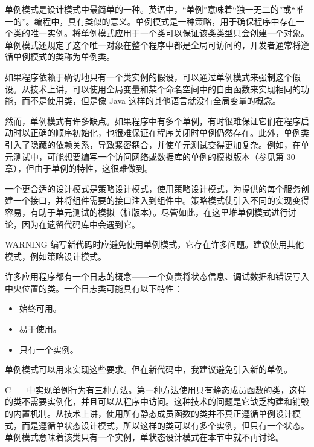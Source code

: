
单例模式是设计模式中最简单的一种。英语中，“单例”意味着“独一无二的”或“唯一的”。编程中，具有类似的意义。单例模式是一种策略，用于确保程序中存在一个类的唯一实例。将单例模式应用于一个类可以保证该类类型只会创建一个对象。单例模式还规定了这个唯一对象在整个程序中都是全局可访问的，开发者通常将遵循单例模式的类称为单例类。

如果程序依赖于确切地只有一个类实例的假设，可以通过单例模式来强制这个假设。从技术上讲，可以使用全局变量和某个命名空间中的自由函数来实现相同的功能，而不是使用类，但是像 Java 这样的其他语言就没有全局变量的概念。

然而，单例模式有许多缺点。如果程序中有多个单例，有时很难保证它们在程序启动时以正确的顺序初始化，也很难保证在程序关闭时单例仍然存在。此外，单例类引入了隐藏的依赖关系，导致紧密耦合，并使单元测试变得更加复杂。例如，在单元测试中，可能想要编写一个访问网络或数据库的单例的模拟版本（参见第 30 章），但由于单例的特性，这很难做到。

一个更合适的设计模式是策略设计模式，使用策略设计模式，为提供的每个服务创建一个接口，并将组件需要的接口注入到组件中。策略模式使引入不同的实现变得容易，有助于单元测试的模拟（桩版本）。尽管如此，在这里堆单例模式进行讨论，因为在遗留代码库中会遇到它。

\begin{myWarning}{WARNING}
编写新代码时应避免使用单例模式，它存在许多问题。建议使用其他模式，例如策略设计模式。
\end{myWarning}


许多应用程序都有一个日志的概念——一个负责将状态信息、调试数据和错误写入中央位置的类。一个日志类可能具有以下特性：

\begin{itemize}
\item
始终可用。

\item
易于使用。

\item
只有一个实例。
\end{itemize}

单例模式可以用来实现这些要求。但在新代码中，我建议避免引入新的单例。


C++ 中实现单例行为有三种方法。第一种方法使用只有静态成员函数的类，这样的类不需要实例化，并且可以从程序中访问。这种技术的问题是它缺乏构建和销毁的内置机制。从技术上讲，使用所有静态成员函数的类并不真正遵循单例设计模式，而是遵循单状态设计模式，所以这样的类可以有多个实例，但只有一个状态。单例模式意味着该类只有一个实例，单状态设计模式在本节中就不再讨论。

